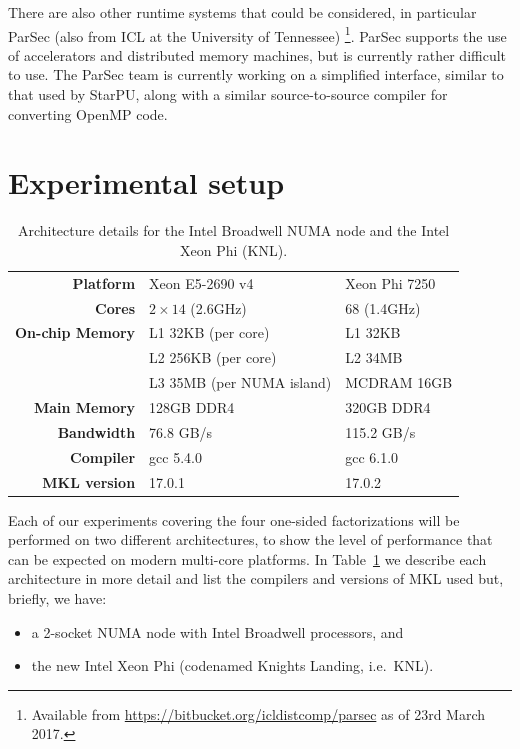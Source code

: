 \documentclass[a4paper,12pt]{article}
\begin{document}
There are also other runtime systems that could be considered,
in particular ParSec (also from ICL at the University of Tennessee)%
\footnote{Available from
  \url{https://bitbucket.org/icldistcomp/parsec} as of 23rd March 2017.}.
ParSec supports the use of accelerators and distributed memory machines,
but is currently rather difficult to use.
The ParSec team is currently working on a simplified interface,
similar to that used by StarPU,
along with a similar source-to-source compiler for converting OpenMP code.

\section{Experimental setup}
\label{sec.arch}

\begin{table}[t]
  \centering
  \caption{Architecture details for the Intel Broadwell NUMA node and
    the Intel Xeon Phi (KNL).}
  \vspace{.5em}
  \begin{tabular}{|r | l | l |}
    \hline
    \textbf{Platform} & Xeon E5-2690 v4 & Xeon Phi 7250\\
    \textbf{Cores}    & $2 \times 14$ (2.6GHz) & 68 (1.4GHz)\\
    \textbf{On-chip Memory} & L1 32KB (per core) & L1 32KB\\
                      & L2 256KB (per core) & L2 34MB\\
                      & L3 35MB (per NUMA island)  & MCDRAM 16GB\\
    \textbf{Main Memory} & 128GB DDR4 & 320GB DDR4\\
    \textbf{Bandwidth} & 76.8 GB/s & 115.2 GB/s\\
    \textbf{Compiler} & gcc 5.4.0 & gcc 6.1.0\\
    \textbf{MKL version} & 17.0.1 & 17.0.2\\
    \hline
  \end{tabular}
  \label{tab.arch}
\end{table}

Each of our experiments covering the four one-sided factorizations
will be performed on two different architectures,
to show the level of performance that can be expected on
modern multi-core platforms.
In Table~\ref{tab.arch} we describe each architecture in more detail
and list the compilers and versions of MKL used but,
briefly, we have:
\begin{itemize}
\item a 2-socket NUMA node with Intel Broadwell processors, and
\item the new Intel Xeon Phi (codenamed Knights Landing, i\@.e\@.~KNL).
\end{itemize}
\end{document}
